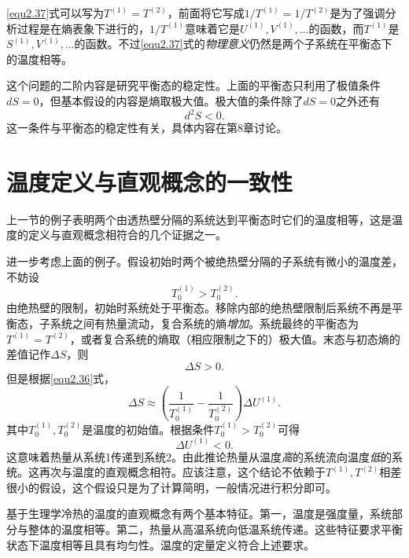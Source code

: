 \eqref{equ2.37}式可以写为$T^{(1)} = T^{(2)}$，前面将它写成$1 /T^{(1)} = 1 / T^{(2)}$是为了强调分析过程是在熵表象下进行的，$1 / T^{(1)}$意味着它是$U^{(1)}, V^{(1)}, \dots$的函数，而$T^{(1)}$是$S^{(1)}, V^{(1)}, \dots$的函数。不过\eqref{equ2.37}式的{\it 物理意义}仍然是两个子系统在平衡态下的温度相等。

这个问题的二阶内容是研究平衡态的稳定性。上面的平衡态只利用了极值条件$dS = 0$，但基本假设的内容是熵取极大值。极大值的条件除了$dS = 0$之外还有
\begin{equation}
\label{equ2.38}
	d^2 S < 0.
\end{equation}
这一条件与平衡态的稳定性有关，具体内容在第8章讨论。

\section{温度定义与直观概念的一致性}
\label{sec2.5}
上一节的例子表明两个由透热壁分隔的系统达到平衡态时它们的温度相等，这是温度的定义与直观概念相符合的几个证据之一。

进一步考虑上面的例子。假设初始时两个被绝热壁分隔的子系统有微小的温度差，不妨设
\begin{equation}
\label{equ2.39}
	T^{(1)}_0 > T^{(2)}_0.
\end{equation}
由绝热壁的限制，初始时系统处于平衡态。移除内部的绝热壁限制后系统不再是平衡态，子系统之间有热量流动，复合系统的熵{\it 增加}。系统最终的平衡态为$T^{(1)} = T^{(2)}$，或者复合系统的熵取（相应限制之下的）极大值。末态与初态熵的差值记作$\Delta S$，则 
\begin{equation}
\label{equ2.40}
	\Delta S > 0.
\end{equation}
但是根据\eqref{equ2.36}式，
\begin{equation}
\label{equ2.41}
	\Delta S \approx \left( \frac{1}{T^{(1)}_0 } - \frac{1}{T^{(2)}_0 } \right) \Delta U^{(1)}.
\end{equation}
其中$T^{(1)}_0, T^{(2)}_0$是温度的初始值。根据条件$T^{(1)}_0 > T^{(2)}_0$可得
\begin{equation}
\label{equ2.42}
	\Delta U^{(1)} < 0.
\end{equation}
这意味着热量从系统1传递到系统2。由此推论热量从温度{\it 高}的系统流向温度{\it 低}的系统。这再次与温度的直观概念相符。应该注意，这个结论不依赖于$T^{(1)}, T^{(2)}$相差很小的假设，这个假设只是为了计算简明，一般情况进行积分即可。

基于生理学冷热的温度的直观概念有两个基本特征。第一，温度是强度量，系统部分与整体的温度相等。第二，热量从高温系统向低温系统传递。这些特征要求平衡状态下温度相等且具有均匀性。温度的定量定义符合上述要求。


